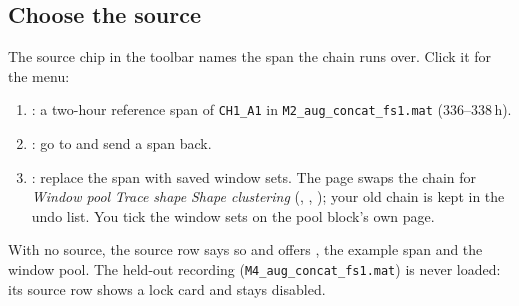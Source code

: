 \subsection*{Choose the source}
The source chip in the toolbar names the span the chain runs over. Click it for the
 menu:
\begin{enumerate}
  \item {}: a two-hour reference span of \texttt{CH1\_A1} in
        \texttt{M2\_aug\_concat\_fs1.mat} (336--338\,h).
  \item {}: go to  and send a span back.
  \item {}: replace the span with saved window sets. The page swaps the
        chain for \emph{Window pool} \textrightarrow{} \emph{Trace shape} \textrightarrow{}
        \emph{Shape clustering} (,
        , ); your old chain
        is kept in the undo list. You tick the window sets on the pool block's own page.
\end{enumerate}
With no source, the source row says so and offers , the example span and the
window pool. The held-out recording (\texttt{M4\_aug\_concat\_fs1.mat}) is never loaded: its
source row shows a lock card and  stays disabled.

